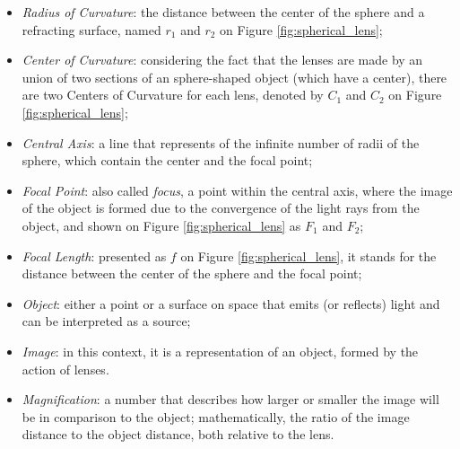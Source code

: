 \begin{itemize}
    \item \emph{Radius of Curvature}: the distance between the center of the sphere and a refracting surface, named $\mathit{r_{1}}$ and $\mathit{r_{2}}$ on Figure \ref{fig:spherical_lens};
    
    \item \emph{Center of Curvature}: considering the fact that the lenses are made by an union of two sections of an sphere-shaped object (which have a center), there are two Centers of Curvature for each lens, denoted by $\mathit{C_{1}}$ and $\mathit{C_{2}}$ on Figure \ref{fig:spherical_lens};
    
    \item \emph{Central Axis}: a line that represents of the infinite number of radii of the sphere, which contain the center and the focal point;
    
    \item \emph{Focal Point}: also called \emph{focus}, a point within the central axis, where the image of the object is formed due to the convergence of the light rays from the object, and shown on Figure \ref{fig:spherical_lens} as $\mathit{F_{1}}$ and $\mathit{F_{2}}$;
    
    \item \emph{Focal Length}: presented as $\mathit{f}$ on Figure \ref{fig:spherical_lens}, it stands for the distance between the center of the sphere and the focal point;
    
    \item \emph{Object}: either a point or a surface on space that emits (or reflects) light and can be interpreted as a source;
    
    \item \emph{Image}: in this context, it is a representation of an object, formed by the action of lenses.
    
    \item \emph{Magnification}: a number that describes how larger or smaller the image will be in comparison to the object; mathematically, the ratio of the image distance to the object distance, both relative to the lens.
    
\end{itemize}

